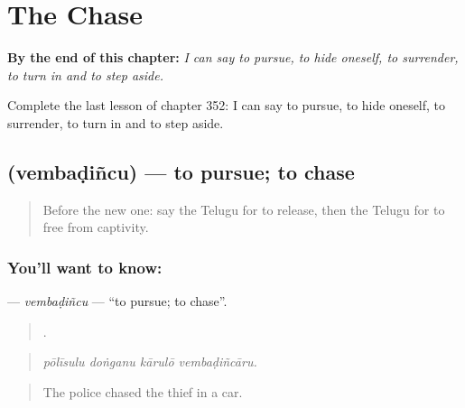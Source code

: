 
\chapter{The Chase}
\label{ch:te-the-chase}

\begin{chapteropening}
\textbf{By the end of this chapter:} \emph{I can say to pursue, to hide oneself, to surrender, to turn in and to step aside.}

Complete the last lesson of chapter 352: I can say to pursue, to hide oneself, to surrender, to turn in and to step aside.
\end{chapteropening}

\section[\texorpdfstring{\te{వెంబడించు} (vembaḍiñcu)}{వెంబడించు (vembaḍiñcu)}]{ (vembaḍiñcu) — to pursue; to chase}

\label{lesson:TE-C352-vembadincu}



\begin{quote}
Before the new one: say the Telugu for to release, then the Telugu for to free from captivity.
\end{quote}

\subsection*{You'll want to know: }
\textbf{} — \emph{vembaḍiñcu} — \textquotedblleft{}to pursue; to chase\textquotedblright{}.

\begin{quote}
   .
\end{quote}

\begin{quote}
\emph{pōlīsulu doṅganu kārulō vembaḍiñcāru.}
\end{quote}

\begin{quote}
The police chased the thief in a car.
\end{quote}

